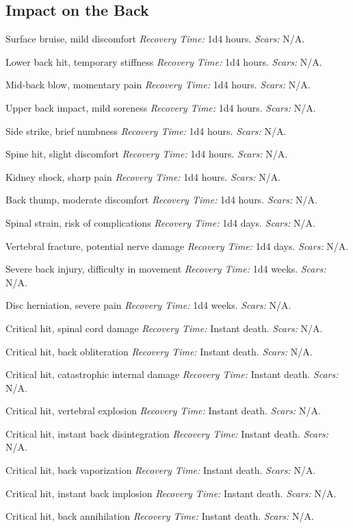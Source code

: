 \subsection{Impact on the Back}

\begin{description}[labelwidth=1.5em, leftmargin=*, itemsep=0.4em]
    \item[1 -] Surface bruise, mild discomfort \textit{Recovery Time:} 1d4 hours. \textit{Scars:} N/A.
    \item[2 -] Lower back hit, temporary stiffness \textit{Recovery Time:} 1d4 hours. \textit{Scars:} N/A.
    \item[3 -] Mid-back blow, momentary pain \textit{Recovery Time:} 1d4 hours. \textit{Scars:} N/A.
    \item[4 -] Upper back impact, mild soreness \textit{Recovery Time:} 1d4 hours. \textit{Scars:} N/A.
    \item[5 -] Side strike, brief numbness \textit{Recovery Time:} 1d4 hours. \textit{Scars:} N/A.
    \item[6 -] Spine hit, slight discomfort \textit{Recovery Time:} 1d4 hours. \textit{Scars:} N/A.
    \item[7 -] Kidney shock, sharp pain \textit{Recovery Time:} 1d4 hours. \textit{Scars:} N/A.
    \item[8 -] Back thump, moderate discomfort \textit{Recovery Time:} 1d4 hours. \textit{Scars:} N/A.
    \item[9 -] Spinal strain, risk of complications \textit{Recovery Time:} 1d4 days. \textit{Scars:} N/A.
    \item[10 -] Vertebral fracture, potential nerve damage \textit{Recovery Time:} 1d4 days. \textit{Scars:} N/A.
    \item[11 -] Severe back injury, difficulty in movement \textit{Recovery Time:} 1d4 weeks. \textit{Scars:} N/A.
    \item[12 -] Disc herniation, severe pain \textit{Recovery Time:} 1d4 weeks. \textit{Scars:} N/A.
    \item[13 -] Critical hit, spinal cord damage \textit{Recovery Time:} Instant death. \textit{Scars:} N/A.
    \item[14 -] Critical hit, back obliteration \textit{Recovery Time:} Instant death. \textit{Scars:} N/A.
    \item[15 -] Critical hit, catastrophic internal damage \textit{Recovery Time:} Instant death. \textit{Scars:} N/A.
    \item[16 -] Critical hit, vertebral explosion \textit{Recovery Time:} Instant death. \textit{Scars:} N/A.
    \item[17 -] Critical hit, instant back disintegration \textit{Recovery Time:} Instant death. \textit{Scars:} N/A.
    \item[18 -] Critical hit, back vaporization \textit{Recovery Time:} Instant death. \textit{Scars:} N/A.
    \item[19 -] Critical hit, instant back implosion \textit{Recovery Time:} Instant death. \textit{Scars:} N/A.
    \item[20 -] Critical hit, back annihilation \textit{Recovery Time:} Instant death. \textit{Scars:} N/A.
\end{description}

